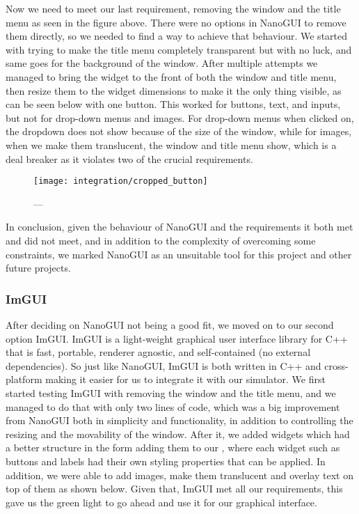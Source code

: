 Now we need to meet our last requirement, removing the window and the title menu as seen in the figure above. There were no options in NanoGUI to remove them directly, so we needed to find a way to achieve that behaviour. We started with trying to make the title menu completely transparent but with no luck, and same goes for the background of the window. After multiple attempts we managed to bring the widget to the front of both the window and title menu, then resize them to the widget dimensions to make it the only thing visible, as can be seen below with one button. This worked for buttons, text, and inputs, but not for drop-down menus and images. For drop-down menus when clicked on, the dropdown does not show because of the size of the window, while for images, when we make them translucent, the window and title menu show, which is a deal breaker as it violates two of the crucial requirements.

\begin{figure}
  \centering%
  \texttt{[image: integration/cropped\_button]}
  \caption{---}
  \label{fig:}
\end{figure}

In conclusion, given the behaviour of NanoGUI and the requirements it both met and did not meet, and in addition to the complexity of overcoming some constraints, we marked NanoGUI as an unsuitable tool for this project and other future projects.

\subsubsection{ImGUI}
\label{ssec:imgui}
After deciding on NanoGUI not being a good fit, we moved on to our second option ImGUI. ImGUI is a light-weight graphical user interface library for C++ that is fast, portable, renderer agnostic, and self-contained (no external dependencies). So just like NanoGUI, ImGUI is both written in C++ and cross-platform making it easier for us to integrate it with our simulator. We first started testing ImGUI with removing the window and the title menu, and we managed to do that with only two lines of code, which was a big improvement from NanoGUI both in simplicity and functionality, in addition to controlling the resizing and the movability of the window. After it, we added widgets which had a better structure in the form adding them to our , where each widget such as buttons and labels had their own styling properties that can be applied. In addition, we were able to add images, make them translucent and overlay text on top of them as shown below. Given that, ImGUI met all our requirements, this gave us the green light to go ahead and use it for our graphical interface.

